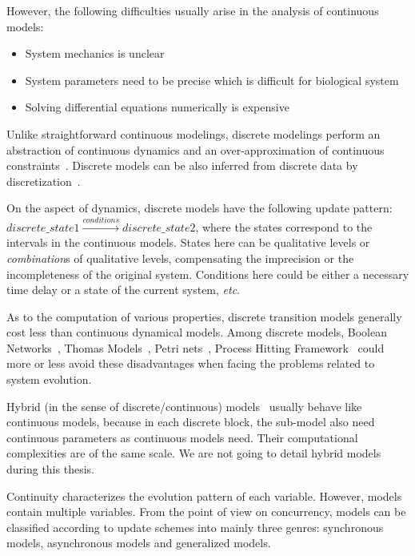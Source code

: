 However, the following difficulties usually arise in the analysis of continuous models:

\begin{itemize}
    \item System mechanics is unclear
    \item System parameters need to be precise which is difficult for biological system
    \item Solving differential equations numerically is expensive 
\end{itemize}

Unlike straightforward continuous modelings, discrete modelings perform an abstraction of continuous dynamics and an over-approximation of continuous constraints~\cite{bernot2009}.
Discrete models can be also inferred from discrete data by discretization~\cite{dimitrova2006polynomial}.

On the aspect of dynamics, discrete models have the following update pattern: $discrete\_state1\xrightarrow{conditions}discrete\_state2$, where the states correspond to the intervals in the continuous models. 
States here can be qualitative levels or \textit{combination}s of qualitative levels, compensating the imprecision or the incompleteness of the original system.
Conditions here could be either a necessary time delay or a state of the current system, \textit{etc}.

As to the computation of various properties, discrete transition models generally cost less than continuous dynamical models.
Among discrete models, Boolean Networks~\cite{kauffman1969}, Thomas Models~\cite{thomas1978}, Petri nets~\cite{pinney2003petri}, Process Hitting Framework~\cite{pauleve2011} could more or less avoid these disadvantages when facing the problems related to system evolution.

Hybrid (in the sense of discrete/continuous) models~\cite{wang2015sreach,lincoln2004symbolic,singhania2011hybrid} usually behave like continuous models, because in each discrete block, the sub-model also need continuous parameters as continuous models need.
Their computational complexities are of the same scale.
We are not going to detail hybrid models during this thesis.

Continuity characterizes the evolution pattern of each variable.
However, models contain multiple variables.
From the point of view on concurrency, models can be classified according to update schemes into mainly three genres: synchronous models, asynchronous models and generalized models.

